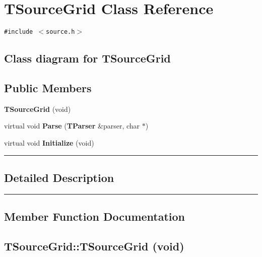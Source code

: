 \section{TSourceGrid  Class Reference}
\label{TSourceGrid}


{\tt \#include $<$source.h$>$}

\subsection*{Class diagram for TSourceGrid}
\begin{figure}[H]
\begin{center}
\leavevmode
\setlength{\epsfysize}{3cm}
\end{center}
\end{figure}
\subsection*{Public Members}
\begin{CompactItemize}
\item 
{\bf TSource\-Grid} (void)
\item 
virtual void {\bf Parse} ({\bf TParser} \&parser, char $\ast$)
\item 
virtual void {\bf Initialize} (void)
\end{CompactItemize}
\vspace{0.4cm}\hrule\vspace{0.2cm}
\subsection*{Detailed Description}
\vspace{0.4cm}\hrule\vspace{0.2cm}
\subsection*{Member Function Documentation}
\label{TSourceGrid_a0}
\subsection{\setlength{\rightskip}{0pt plus 5cm}TSource\-Grid::TSource\-Grid (void)}

\label{TSourceGrid_a1}
